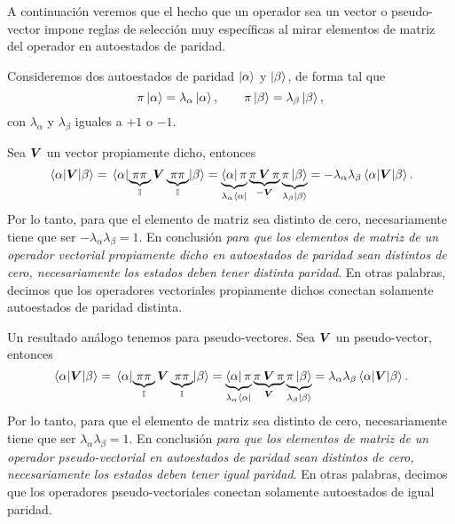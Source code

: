 \documentclass[10pt, a4paper]{article}
\numberwithin{equation}{subsection}
\begin{document}
A continuación veremos que el hecho que un operador sea un vector o
pseudo-vector impone reglas de selección muy específicas al mirar elementos de
matriz del operador en autoestados de paridad.

Consideremos dos autoestados de paridad $\ket{\alpha}$ y $\ket{\beta}$, de
forma tal que
\begin{equation}
  \pi\ket{\alpha} = \lambda_\alpha\ket{\alpha}, \qquad
  \pi\ket{\beta} = \lambda_\beta\ket{\beta},
\end{equation}
con $\lambda_\alpha$ y $\lambda_\beta$ iguales a $+1$ o $-1$.

Sea $\vb*{V}$ un vector propiamente dicho, entonces
\begin{equation}
  \matrixel{\alpha}{\vect{V}}{\beta} = \matrixel{\alpha}{
    \underbrace{\parityop\parityop}_{\Id} \vect{V}
    \underbrace{\parityop\parityop}_{\Id}}{\beta}
  = \underbrace{\bra{\alpha}\parityop}_{\lambda_\alpha\bra{\alpha}}
    \underbrace{\parityop\,\vect{V}\,\parityop}_{-\vect{V}}
    \underbrace{\parityop\ket{\beta}}_{\lambda_\beta\ket{\beta}}
  = -\lambda_\alpha\lambda_\beta\matrixel{\alpha}{\vect{V}}{\beta}.
\end{equation}
Por lo tanto, para que el elemento de matriz sea distinto de cero,
necesariamente tiene que ser $-\lambda_\alpha\lambda_\beta = 1$.
En conclusión \emph{para que los elementos de matriz de un operador vectorial
propiamente dicho en autoestados de paridad sean distintos de cero,
necesariamente los estados deben tener distinta paridad}. En otras palabras,
decimos que los operadores vectoriales propiamente dichos conectan solamente
autoestados de paridad distinta.

Un resultado análogo tenemos para pseudo-vectores. Sea $\vb*{V}$ un
pseudo-vector, entonces
\begin{equation}
  \matrixel{\alpha}{\vect{V}}{\beta} = \matrixel{\alpha}{
    \underbrace{\parityop\parityop}_{\Id} \vect{V}
    \underbrace{\parityop\parityop}_{\Id}}{\beta}
  = \underbrace{\bra{\alpha}\parityop}_{\lambda_\alpha\bra{\alpha}}
    \underbrace{\parityop\,\vect{V}\,\parityop}_{\vect{V}}
    \underbrace{\parityop\ket{\beta}}_{\lambda_\beta\ket{\beta}}
  = \lambda_\alpha\lambda_\beta\matrixel{\alpha}{\vect{V}}{\beta}.
\end{equation}
Por lo tanto, para que el elemento de matriz sea distinto de cero,
necesariamente tiene que ser $\lambda_\alpha\lambda_\beta = 1$.
En conclusión \emph{para que los elementos de matriz de un operador
pseudo-vectorial en autoestados de paridad sean distintos de cero,
necesariamente los estados deben tener igual paridad}. En otras palabras,
decimos que los operadores pseudo-vectoriales conectan solamente autoestados de
igual paridad.
\end{document}
